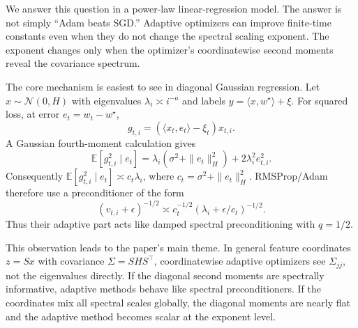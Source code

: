 \documentclass[11pt]{article}
\newcommand{\E}{\mathbb{E}}
\begin{document}
We answer this question in a power-law linear-regression model.  The answer is not simply ``Adam beats SGD.''  Adaptive optimizers can improve finite-time constants even when they do not change the spectral scaling exponent.  The exponent changes only when the optimizer's coordinatewise second moments reveal the covariance spectrum.

The core mechanism is easiest to see in diagonal Gaussian regression.  Let $x\sim\mathcal N(0,H)$ with eigenvalues $\lambda_i\asymp i^{-a}$ and labels $y=\langle x,w^\star\rangle+\xi$.  For squared loss, at error $e_t=w_t-w^\star$,
\begin{equation}
    g_{t,i}=(\langle x_t,e_t\rangle-\xi_t)x_{t,i}.
\end{equation}
A Gaussian fourth-moment calculation gives
\begin{equation}
\label{eq:grad-second-moment}
    \E[g_{t,i}^2\mid e_t]
    =
    \lambda_i(\sigma^2+\|e_t\|_H^2)+2\lambda_i^2e_{t,i}^2.
\end{equation}
Consequently $\E[g_{t,i}^2\mid e_t]\asymp c_t\lambda_i$, where $c_t=\sigma^2+\|e_t\|_H^2$.  RMSProp/Adam therefore use a preconditioner of the form
\begin{equation}
    (v_{t,i}+\epsilon)^{-1/2}
    \asymp
    c_t^{-1/2}(\lambda_i+\epsilon/c_t)^{-1/2}.
\end{equation}
Thus their adaptive part acts like damped spectral preconditioning with $q=1/2$.

This observation leads to the paper's main theme.  In general feature coordinates $z=Sx$ with covariance $\Sigma=SHS^\top$, coordinatewise adaptive optimizers see $\Sigma_{jj}$, not the eigenvalues directly.  If the diagonal second moments are spectrally informative, adaptive methods behave like spectral preconditioners.  If the coordinates mix all spectral scales globally, the diagonal moments are nearly flat and the adaptive method becomes scalar at the exponent level.
\end{document}
